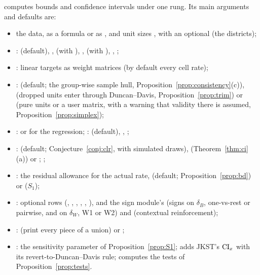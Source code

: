  computes bounds and confidence intervals under one rung. Its
main arguments and defaults are:
\begin{itemize}
\item the data, as a formula or as ,  and unit sizes , with
an optional  (the districts);
\item {}:  (default), ,  (with
), ,  (with ), ,
;
\item {}: linear targets as weight matrices (by default every cell rate);
\item {}:  (default; the group-wise sample hull,
Proposition~\ref{prop:consistency}(c)),  (dropped units enter
through Duncan--Davis, Proposition~\ref{prop:trim}) or  (pure
units or a user matrix, with a warning that validity there is assumed,
Proposition~\ref{prop:simplex});
\item {}:  or  for the regression;
:  (default), , ;
\item {}:  (default; Conjecture~\ref{conj:clr}, with
 simulated draws), 
(Theorem~\ref{thm:ci}(a)) or ; ;
\item {}: the residual allowance for the actual rate,
 (default; Proposition~\ref{prop:bd}) or 
($S_1$);
\item {}: optional rows (, , ,
, , ), and the sign module's 
(signs on $\delta_B$, one-vs-rest or pairwise, and on $\delta_W$, W1 or W2) and
 (contextual reinforcement);
\item {}:  (print every piece of a union) or ;
\item {}: the sensitivity parameter of Proposition~\ref{prop:S1};
 adds JKST's $\mathrm{CI}_x$ with its revert-to-Duncan--Davis rule;
 computes the tests of Proposition~\ref{prop:tests}.
\end{itemize}

